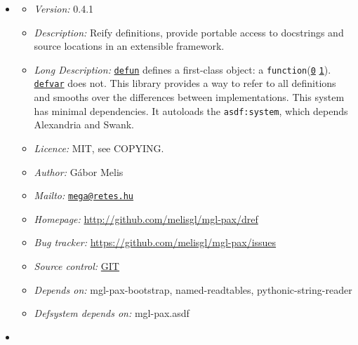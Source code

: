 \begin{itemize}
\item
  \label{x-28-22dref-22-20ASDF-2FSYSTEM-3ASYSTEM-29}

  \begin{itemize}
  \item
    \emph{Version:} 0.4.1
  \item
    \emph{Description:} Reify definitions, provide portable access to
    docstrings and source locations in an extensible framework.
  \item
    \emph{Long Description:}
    \href{http://www.lispworks.com/documentation/HyperSpec/Body/m_defun.htm}{\texttt{defun}}
    defines a first-class object: a
    \texttt{function}(\href{http://www.lispworks.com/documentation/HyperSpec/Body/t_fn.htm}{\texttt{0}}
    \href{http://www.lispworks.com/documentation/HyperSpec/Body/s_fn.htm}{\texttt{1}}).
    \href{http://www.lispworks.com/documentation/HyperSpec/Body/m_defpar.htm}{\texttt{defvar}}
    does not. This library provides a way to refer to all definitions
    and smooths over the differences between implementations. This
    system has minimal dependencies. It autoloads the
    \texttt{asdf:system}, which depends Alexandria and Swank.
  \item
    \emph{Licence:} MIT, see COPYING.
  \item
    \emph{Author:} Gábor Melis
  \item
    \emph{Mailto:}
    \href{mailto:mega@retes.hu}{\nolinkurl{mega@retes.hu}}
  \item
    \emph{Homepage:} \url{http://github.com/melisgl/mgl-pax/dref}
  \item
    \emph{Bug tracker:} \url{https://github.com/melisgl/mgl-pax/issues}
  \item
    \emph{Source control:}
    \href{https://github.com/melisgl/mgl-pax.git}{GIT}
  \item
    \emph{Depends on:} mgl-pax-bootstrap, named-readtables,
    pythonic-string-reader
  \item
    \emph{Defsystem depends on:} mgl-pax.asdf
  \end{itemize}
\item
  \label{x-28-22dref-2Ffull-22-20ASDF-2FSYSTEM-3ASYSTEM-29}


\end{itemize}
